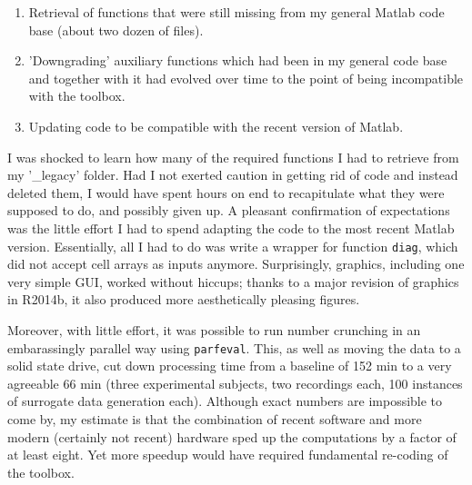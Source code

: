\begin{enumerate}
	\item Retrieval of functions that were still missing from my general Matlab code base (about two dozen of files).
	\item 'Downgrading' auxiliary functions which had been in my general code base and together with it had evolved over time to the point of being incompatible with the toolbox.
	\item Updating code to be compatible with the recent version of Matlab.
\end{enumerate}

I was shocked to learn how many of the required functions I had to retrieve from my '\_legacy' folder. Had I not exerted caution in getting rid of code and instead deleted them, I would have spent hours on end to recapitulate what they were supposed to do, and possibly given up. A pleasant confirmation of expectations was the little effort I had to spend adapting the code to the most recent Matlab version. Essentially, all I had to do was write a wrapper for function \texttt{diag}, which did not accept cell arrays as inputs anymore. Surprisingly, graphics, including one very simple GUI, worked without hiccups; thanks to a major revision of graphics in R2014b, it also produced more aesthetically pleasing figures. 

Moreover, with little effort, it was possible to run number crunching in an embarassingly parallel way using \texttt{parfeval}. This, as well as moving the data to a solid state drive, cut down processing time from a baseline of 152 min to a very agreeable 66 min (three experimental subjects, two recordings each, 100 instances of surrogate data generation each). Although exact numbers are impossible to come by, my estimate is that the combination of recent software and more modern (certainly not recent) hardware sped up the computations by a factor of at least eight. Yet more speedup would have required fundamental re-coding of the toolbox.

